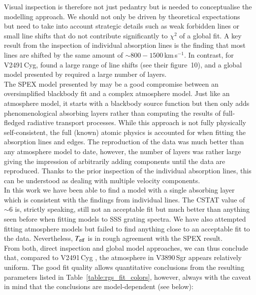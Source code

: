 \documentclass{aa}
\begin{document}
Visual inspection is therefore not just pedantry but is needed to conceptualise
the modelling approach. We should not only be driven by theoretical
expectations but need to take into account strategic details such as weak
forbidden lines or small line shifts that do not contribute significantly
to $\chi^2$ of a global fit. A key result from the inspection of individual
absorption lines is the finding that most lines are shifted by the same
amount of $\sim 800-1500$\,km\,s$^{-1}$. In contrast, for V2491\,Cyg,
\cite{nessv2491} found a large range of line shifts (see their figure~10),
and a global model presented by \cite{pinto12} required a large number of
layers.\\

The SPEX model presented by \cite{pinto12} may be a good compromise between
an oversimplified blackbody fit and a complex atmosphere model. Just like
an atmosphere model, it starts with a blackbody source function but then
only adds phenomenological absorbing layers rather than computing the results
of full-fledged radiative transport processes. While this approach is not
fully physically self-consistent, the full (known) atomic physics is
accounted for when fitting the
absorption lines and edges. The reproduction of the data was much better
than any atmosphere model to date, however, the number of layers was rather
large giving the impression of arbitrarily adding components
until the data are reproduced. Thanks to the prior inspection of the individual
absorption lines, this can be understood as dealing with multiple velocity
components.\\

In this work we have been able to find a model with a single absorbing layer
which is consistent with the findings from individual lines. The
{\scriptsize{CSTAT}} value of $\sim 6$ is, strictly speaking, still not an
acceptable fit but much better than anything seen before when fitting
models to SSS grating spectra. We have also
attempted fitting atmosphere models but failed to find anything close
to an acceptable fit to the data. Nevertheless, $T_{\rm eff}$ is
in rough agreement with the SPEX result.\\

From both, direct inspection and global model approaches, we can thus
conclude that, compared to V2491\,Cyg \citep{pinto12}, the atmosphere
in V3890\,Sgr appears relatively uniform. The good fit quality allows
quantitative conclusions from the resulting parameters listed in
Table~\ref{table:rgs_fit_colors}, however, always with the caveat in
mind that the conclusions are model-dependent (see below):\\
\end{document}
